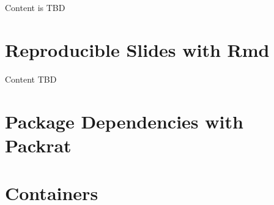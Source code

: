 \documentclass[]{book}
\theoremstyle{definition}
\theoremstyle{definition}
\theoremstyle{definition}
\theoremstyle{remark}
\begin{document}
Content is TBD

\chapter{Reproducible Slides with
Rmd}\label{reproducible-slides-with-rmd}

Content TBD

\chapter{Package Dependencies with
Packrat}\label{package-dependencies-with-packrat}

\chapter{Containers}\label{containers}


\end{document}
